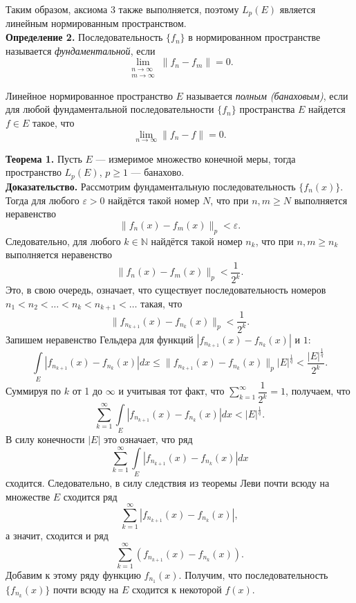 \documentclass[12pt,a4paper, titlepage]{article}
\begin{document}
Таким образом, аксиома 3 также выполняется, поэтому $L_p(E)$ является линейным нормированным пространством.\\

\textbf{Определение 2.} Последовательность $\lbrace f_n \rbrace$ в нормированном пространстве называется \textit{фундаментальной}, если
$$
\lim_{\substack{n\to\infty \\ m\to\infty }} \|f_n - f_m\| = 0.
$$

Линейное нормированное пространство $E$ называется \textit{полным (банаховым)}, если для любой фундаментальной последовательности $\lbrace f_n \rbrace$ пространства $E$ найдется $f \in E$ такое, что
$$
\lim_{n\to\infty} \|f_n - f\| = 0.
$$

\textbf{Теорема 1.} Пусть $E$ --- измеримое множество конечной меры, тогда пространство $L_p(E)$, $p \geqslant 1$ --- банахово.\\
\textbf{Доказательство.}
Рассмотрим фундаментальную последовательность $\lbrace f_n(x) \rbrace$. Тогда для любого $\varepsilon > 0$ найдётся такой номер $N$, что при $n, m \geqslant N$ выполняется неравенство
$$
\|f_n(x) - f_m(x)\|_p < \varepsilon.
$$
Следовательно, для любого $k \in \mathbb{N}$ найдётся такой номер $n_k$, что при $n, m \geqslant n_k$ выполняется неравенство
$$
\|f_n(x) - f_m(x)\|_p < \frac 1 {2^k}.
$$
Это, в свою очередь, означает, что существует последовательность номеров $n_1 < n_2 < \dots < n_k < n_{k+1} < \dots$ такая, что
$$
\|f_{n_{k+1}}(x) - f_{n_k}(x)\|_p < \frac 1 {2^k}.
$$
Запишем неравенство Гельдера для функций $|f_{n_{k+1}}(x) - f_{n_k}(x)|$ и $1$:
$$
\int\limits_E |f_{n_{k+1}}(x) - f_{n_k}(x)|dx \leqslant \|f_{n_{k+1}} (x) - f_{n_k} (x)\|_p |E|^{\frac 1 q} < \frac {|E|^{\frac 1 q}}{2^k}.
$$
Суммируя по $k$ от 1 до $\infty$ и учитывая тот факт, что $\sum\limits_{k=1}^\infty \dfrac 1 {2^k} = 1$, получаем, что
$$
\sum_{k=1}^\infty \int\limits_E |f_{n_{k+1}} (x) - f_{n_k}(x)| dx < |E|^{\frac 1 q}.
$$
В силу конечности $|E|$ это означает, что ряд
$$
\sum_{k=1}^\infty \int\limits_E |f_{n_{k+1}} (x) - f_{n_k}(x)| dx
$$
сходится. Следовательно, в силу следствия из теоремы Леви почти всюду на множестве $E$ сходится ряд 
$$
\sum_{k=1}^\infty \left| f_{n_{k+1}} (x) - f_{n_k} (x) \right|,
$$
а значит, сходится и ряд
$$
\sum_{k=1}^\infty \left(f_{n_{k+1}}(x) - f_{n_k}(x)\right).
$$
Добавим к этому ряду функцию $f_{n_1}(x)$. Получим, что последовательность $\lbrace f_{n_k}(x) \rbrace$ почти всюду на $E$ сходится к некоторой $f(x)$.\\
\end{document}
